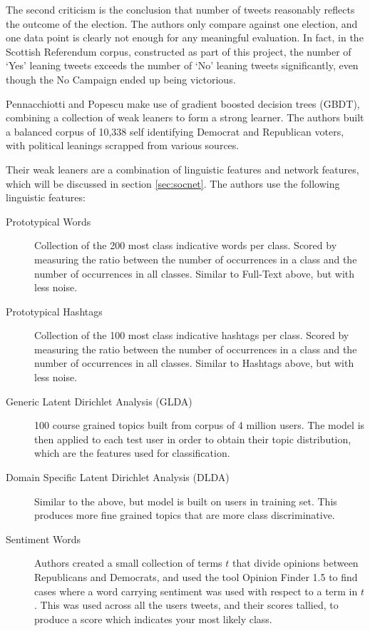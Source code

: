 \documentclass[bsc,frontabs,singlespacing,parskip]{infthesis}     %
\begin{document}
The second criticism is the conclusion that number of tweets reasonably reflects the outcome of the election. The authors only compare against one election, and one data point is clearly not enough for any meaningful evaluation. In fact, in the Scottish Referendum corpus, constructed as part of this project, the number of `Yes' leaning tweets exceeds the number of `No' leaning tweets significantly, even though the No Campaign ended up being victorious. 

Pennacchiotti and Popescu \cite{yahoopaper} make use of gradient boosted decision trees (GBDT), combining a collection of weak leaners to form a strong learner. The authors built a balanced corpus of 10,338 self identifying Democrat and Republican voters, with political leanings scrapped from various sources. 

Their weak leaners are a combination of linguistic features and network features, which will be discussed in section \ref{sec:socnet}. The authors use the following linguistic features:

\begin{description}
\item[Prototypical Words] Collection of the 200 most class indicative words per class. Scored by measuring the ratio between the number of occurrences in a class and the number of occurrences in all classes. Similar to Full-Text above, but with less noise.
\item[Prototypical Hashtags] Collection of the 100 most class indicative hashtags per class. Scored by measuring the ratio between the number of occurrences in a class  and the number of occurrences in all classes. Similar to Hashtags above, but with less noise.
\item[Generic Latent Dirichlet Analysis (GLDA)] 100 course grained topics built from corpus of 4 million users. The model is then applied to each test user in order to obtain their topic distribution, which are the features used for classification.
\item[Domain Specific Latent Dirichlet Analysis (DLDA)] Similar to the above, but model is built on users in training set. This produces more fine grained topics that are more class discriminative. 
\item[Sentiment Words] Authors created a small collection of terms $t$ that divide opinions between Republicans and Democrats, and used the tool Opinion Finder 1.5 to find cases where a word carrying sentiment was used with respect to a term in $t$. This was used across all the users tweets, and their scores tallied, to produce a score which indicates your most likely class. 
\end{description}
\end{document}
